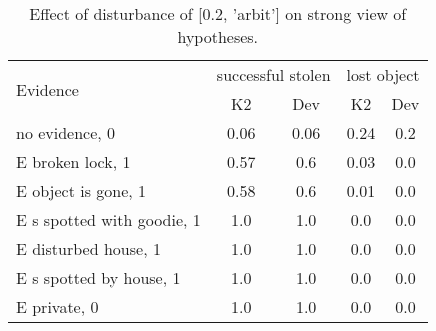 \begin{table}\begin{tabular}{l|cc|cc}\toprule\multirow{2}{*}{Evidence} & \multicolumn{2}{c}{successful stolen}& \multicolumn{2}{c}{lost object}\\& {K2} & {Dev}& {K2} & {Dev}\\\midrule
no evidence, 0 & 0.06&0.06&0.24&0.2\\E broken lock, 1 & 0.57&0.6&0.03&0.0\\E object is gone, 1 & 0.58&0.6&0.01&0.0\\E s spotted with goodie, 1 & 1.0&1.0&0.0&0.0\\E disturbed house, 1 & 1.0&1.0&0.0&0.0\\E s spotted by house, 1 & 1.0&1.0&0.0&0.0\\E private, 0 & 1.0&1.0&0.0&0.0\\\bottomrule\end{tabular}\caption{Effect of disturbance of [0.2, 'arbit'] on strong view of hypotheses.}\end{table}